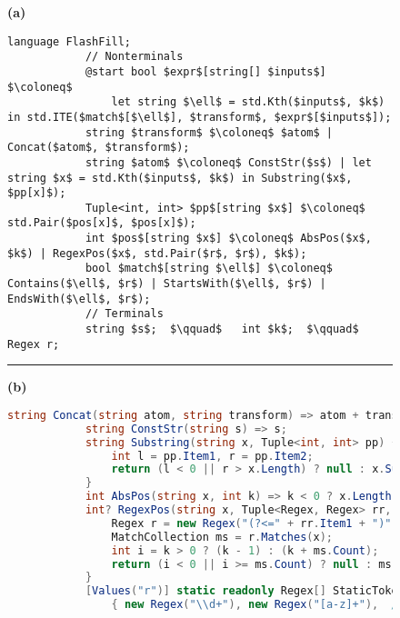 \begin{figure}[p!]
    \begin{fullpage}
        \centering
        \lstset{basicstyle = \footnotesize\ttfamily}
        \def\baselinestretch{1.05}
        \hfill\textbf{(a)}
        \vspace{-0.8\baselineskip}
        \begin{lstlisting}[language=dsl,gobble=12,morekeywords={Regex}]
            language FlashFill;
            // Nonterminals
            @start bool $expr$[string[] $inputs$] $\coloneq$
                let string $\ell$ = std.Kth($inputs$, $k$) in std.ITE($match$[$\ell$], $transform$, $expr$[$inputs$]);
            string $transform$ $\coloneq$ $atom$ | Concat($atom$, $transform$);
            string $atom$ $\coloneq$ ConstStr($s$) | let string $x$ = std.Kth($inputs$, $k$) in Substring($x$, $pp[x]$);
            Tuple<int, int> $pp$[string $x$] $\coloneq$ std.Pair($pos[x]$, $pos[x]$);
            int $pos$[string $x$] $\coloneq$ AbsPos($x$, $k$) | RegexPos($x$, std.Pair($r$, $r$), $k$);
            bool $match$[string $\ell$] $\coloneq$ Contains($\ell$, $r$) | StartsWith($\ell$, $r$) | EndsWith($\ell$, $r$);
            // Terminals
            string $s$;  $\qquad$   int $k$;  $\qquad$  Regex r;
        \end{lstlisting}
        \hrule
        \vspace{5pt}
        \hfill\textbf{(b)}
        \vspace{-0.9\baselineskip}
        \begin{lstlisting}[language=csharp,gobble=12,breaklines=false,morekeywords={Tuple}]
            string Concat(string atom, string transform) => atom + transform;
            string ConstStr(string s) => s;
            string Substring(string x, Tuple<int, int> pp) {
                int l = pp.Item1, r = pp.Item2;
                return (l < 0 || r > x.Length) ? null : x.Substring(l, r - l);
            }
            int AbsPos(string x, int k) => k < 0 ? x.Length + k + 1 : k;
            int? RegexPos(string x, Tuple<Regex, Regex> rr, int k) {
                Regex r = new Regex("(?<=" + rr.Item1 + ")" + rr.Item2);
                MatchCollection ms = r.Matches(x);
                int i = k > 0 ? (k - 1) : (k + ms.Count);
                return (i < 0 || i >= ms.Count) ? null : ms[i].Index;
            }
            [Values("r")] static readonly Regex[] StaticTokens =
                { new Regex("\\d+"), new Regex("[a-z]+"),  /* more tokens... */ }
        \end{lstlisting}

\end{fullpage}
\end{figure}
